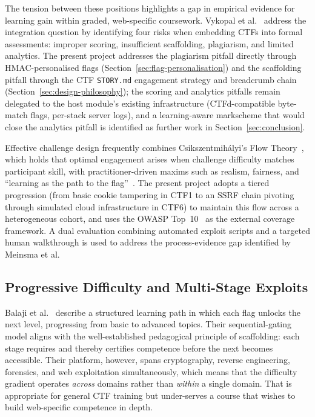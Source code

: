 The tension between these positions highlights a gap in empirical
evidence for learning gain within graded, web-specific coursework.
Vykopal et al.~\cite{Vykopal} address the integration question by
identifying four risks when embedding CTFs into formal assessments:
improper scoring, insufficient scaffolding, plagiarism, and limited
analytics. The present project addresses the plagiarism pitfall
directly through HMAC-personalised flags
(Section~\ref{sec:flag-personalisation}) and the scaffolding
pitfall through the CTF \texttt{STORY.md} engagement strategy and breadcrumb
chain (Section~\ref{sec:design-philosophy}); the scoring and
analytics pitfalls remain delegated to the host module's
existing infrastructure (CTFd-compatible byte-match flags,
per-stack server logs), and a learning-aware markscheme that
would close the analytics pitfall is identified as further
work in Section~\ref{sec:conclusion}.

Effective challenge design frequently combines
Csikszentmih{\'a}lyi's Flow
Theory~\cite{Csikszentmihalyi}, which holds that optimal
engagement arises when challenge difficulty matches participant
skill, with practitioner-driven maxims such as realism, fairness,
and ``learning as the path to the flag''~\cite{Fuzyll2015,Balaji2025}.
The present project adopts a tiered progression (from basic cookie
tampering in CTF1 to an SSRF chain pivoting through simulated cloud
infrastructure in CTF6) to maintain this flow across a heterogeneous
cohort, and uses the OWASP Top~10~\cite{OWASP2025} as the external
coverage framework. A dual evaluation combining automated exploit
scripts and a targeted human walkthrough is used to address the
process-evidence gap identified by Meinsma et al.



\subsection{Progressive Difficulty and Multi-Stage Exploits}
Balaji et al.~\cite{Balaji2025} describe a structured learning path
in which each flag unlocks the next level, progressing from basic
to advanced topics. Their sequential-gating model aligns with the
well-established pedagogical principle of scaffolding: each stage
requires and thereby certifies competence before the next becomes
accessible. Their platform, however, spans cryptography, reverse
engineering, forensics, and web exploitation simultaneously, which
means that the difficulty gradient operates \textit{across} domains
rather than \textit{within} a single domain. That is appropriate for
general CTF training but under-serves a course that wishes to build
web-specific competence in depth.

